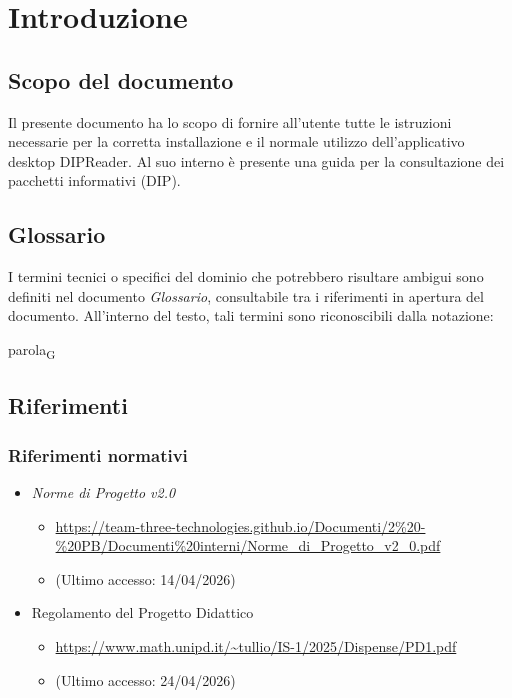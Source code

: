 \documentclass[a4paper,12pt]{article}
\begin{document}
    \section{Introduzione} {
        \subsection{Scopo del documento} {        
            Il presente documento ha lo scopo di fornire all'utente tutte le istruzioni necessarie per la corretta installazione e il normale utilizzo dell'applicativo desktop DIPReader.
            Al suo interno è presente una guida per la consultazione dei pacchetti informativi (DIP).
        }

        \subsection{Glossario}
            I termini tecnici o specifici del dominio che potrebbero risultare ambigui sono definiti nel documento \textit{Glossario}, consultabile tra i riferimenti in apertura del documento. All'interno del testo, tali termini sono 
            riconoscibili dalla notazione:
                \begin{center}
                    parola\textsubscript{G}
                \end{center}
        
        \subsection{Riferimenti} {
            \subsubsection{Riferimenti normativi} {
            \begin{itemize}
                \item \textit{Norme di Progetto v2.0}
                \begin{itemize}
                    \item \url{https://team-three-technologies.github.io/Documenti/2%20-%20PB/Documenti%20interni/Norme_di_Progetto_v2_0.pdf}
                    \item[] (Ultimo accesso: 14/04/2026)
                \end{itemize}
                \item Regolamento del Progetto Didattico
                \begin{itemize}
                    \item \url{https://www.math.unipd.it/~tullio/IS-1/2025/Dispense/PD1.pdf}
                    \item[] (Ultimo accesso: 24/04/2026)
                \end{itemize}
            \end{itemize}
            }
}}
\end{document}
